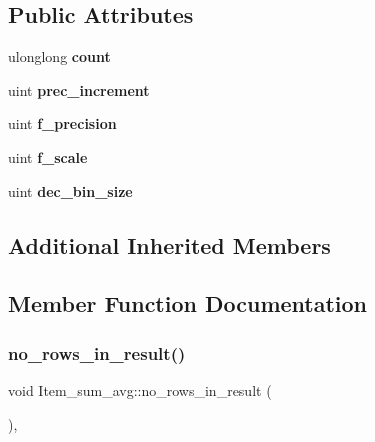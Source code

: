 \subsection*{Public Attributes}
\begin{DoxyCompactItemize}
\item 
\mbox{\label{classItem__sum__avg_a125f8101ecdc6c73fdc747c8003cddf5}} 
ulonglong {\bfseries count}
\item 
\mbox{\label{classItem__sum__avg_af14db615df9815d148437b00b60ac1ce}} 
uint {\bfseries prec\+\_\+increment}
\item 
\mbox{\label{classItem__sum__avg_affb8365c6091ed3ed4e893c82f17b810}} 
uint {\bfseries f\+\_\+precision}
\item 
\mbox{\label{classItem__sum__avg_a9aee8457a7a0a0729c2184db1467496b}} 
uint {\bfseries f\+\_\+scale}
\item 
\mbox{\label{classItem__sum__avg_af3c73ea7847dd7f11309671303f1be2c}} 
uint {\bfseries dec\+\_\+bin\+\_\+size}
\end{DoxyCompactItemize}
\subsection*{Additional Inherited Members}


\subsection{Member Function Documentation}
\mbox{\label{classItem__sum__avg_ab4cfa5a3c42abc40f7f3fdb95c92d568}} 
\subsubsection{\texorpdfstring{no\+\_\+rows\+\_\+in\+\_\+result()}{no\_rows\_in\_result()}}
{\footnotesize\ttfamily void Item\+\_\+sum\+\_\+avg\+::no\+\_\+rows\+\_\+in\+\_\+result (\begin{DoxyParamCaption}{ }\end{DoxyParamCaption})\hspace{0.3cm}{\ttfamily [inline]}, {\ttfamily [virtual]}}

